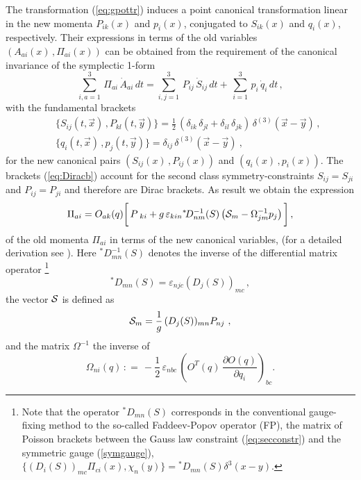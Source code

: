 \documentclass[a4paper,12pt]{article}
\begin{document}
The transformation (\ref{eq:gpottr}) induces a point canonical
transformation linear in the new momenta $P_{ik}(x)$ and $p_i(x)$,
conjugated to $S_{ik}(x)$ and $q_i (x)$, respectively.
Their expressions in terms of the old variables
$(A_{ai}(x)\,, \Pi_{ai}(x))$ can be obtained from the requirement
of the canonical invariance of the symplectic 1-form
\begin{equation}
\label{eq:can1f}
\sum^3_{i, a = 1 }\, \Pi_{ai}\, \dot{A}_{ai}\, dt  =
\sum^3_{i, j = 1}\, P_{ij}\, \dot{S}_{ij}\, dt  +
\,\sum^3_{i = 1} \, p_i\, \dot{q}_i\, dt\,,
\end{equation}
with the fundamental brackets
\begin{eqnarray}
\label{eq:Diracb}
&&
\{ S_{i j}(t, \vec{x}) \,, P_{k l}(t, \vec{y}) \} = \frac{1}{2}\,
\left(\delta_{i k}\, \delta_{j l} + \delta_{i l}\, \delta_{j k} \right)\,
\delta^{(3)}(\vec{x} - \vec{y})\,,\\
&&
\{ q_i(t, \vec{x}) \,,  p_j (t, \vec{y})\} =
\delta_{i j}\, \delta^{(3)}(\vec{x} - \vec{y})~,
\end{eqnarray}
for the new canonical
pairs $\left(S_{ij}(x)\,, P_{ij}(x)\right)$ and
$\left(q_{i}(x)\,, p_{i}(x)\right)$.
The brackets (\ref{eq:Diracb}) account for the second class symmetry-constraints
$S_{ij} = S_{ji}$ and $P_{ij} = P_{ji}$ and therefore are Dirac brackets.
As result we obtain the expression
\begin{equation}
\label{eq:elpotn}
\Pi_{ai} = O_{ak}(q) \biggl[\,
P_{\ ki} + g \, \varepsilon _{kin}{}^\ast\! D^{-1}_{nm}(S)
\left( {\cal S}_m - \Omega^{-1}_{jm} p_j\right) \,
\biggr]\,,
\end{equation}
of the old momenta $\Pi_{ai}$ in terms of the new canonical variables,
(for a detailed derivation see \cite{KP}).
Here ${}^\ast\! D_{mn}^{-1}(S)$ denotes the inverse of
the differential matrix operator
\footnote{Note that the operator ${}^\ast\! D_{mn}(S)$
 corresponds in the conventional gauge-fixing
method to the so-called Faddeev-Popov operator (FP),
the matrix of Poisson brackets between the Gauss law constraint
(\ref{eq:secconstr}) and  the symmetric gauge (\ref{symgauge}),
 $\{ \left(D_i(S)\right)_{mc} \Pi_{ci}(x), \chi_n (y)\}=
 {}^\ast\! D_{mn}(S)\delta^3(x-y).$ }
\begin{equation}
\label{DeltaQ}
{}^\ast\! D_{mn}(S)  =  \varepsilon_{njc}\left(D_j(S)\right)_{mc}\,,
\end{equation}
the vector ${\cal S}$ is defined as
\begin{equation}
{\cal S}_m   = \frac{1}{g} \, (D_j(S))_{mn}P_{nj}~,
\end{equation}
and the matrix $\Omega^{-1}$ the inverse of
\begin{equation}
\label{Omega}
\Omega_{ni}(q) \, : =
\,-\frac{1}{2}\, \varepsilon_{nbc}\,
\left( O^T(q)\, \frac{\partial O(q)}{\partial q_i}\right)_{bc}.
\end{equation}
\end{document}
